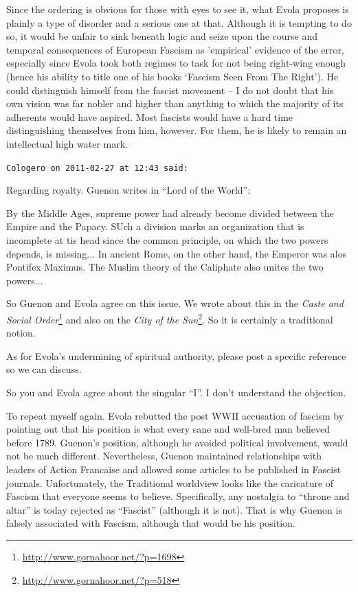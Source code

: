 \begin{footnotesize}
\begin{sffamily}
Since the ordering is obvious for those with eyes to see it, what Evola proposes is plainly a type of disorder and a serious one at that. Although it is tempting to do so, it would be unfair to sink beneath logic and seize upon the course and temporal consequences of European Fascism as 'empirical' evidence of the error, especially since Evola took both regimes to task for not being right-wing enough (hence his ability to title one of his books `Fascism Seen From The Right'). He could distinguish himself from the fascist movement -- I do not doubt that his own vision was far nobler and higher than anything to which the majority of its adherents would have aspired. Most fascists would have a hard time distinguishing themselves from him, however. For them, he is likely to remain an intellectual high water mark.

\hfill

\texttt{Cologero on 2011-02-27 at 12:43 said:}

Regarding royalty. Guenon writes in ``Lord of the World'':

\begin{quotex}

By the Middle Ages, supreme power had already become divided between the Empire and the Papacy. SUch a division marks an organization that is incomplete at tis head since the common principle, on which the two powers depends, is missing... In ancient Rome, on the other hand, the Emperor was alos Pontifex Maximus. The Muslim theory of the Caliphate also unites the two powers... \end{quotex}


So Guenon and Evola agree on this issue. We wrote about this in the \textit{Caste and Social Order}\footnote{\url{http://www.gornahoor.net/?p=1698}} and also on the \textit{City of the Sun}\footnote{\url{http://www.gornahoor.net/?p=518}}. So it is certainly a traditional notion.

As for Evola's undermining of spiritual authority, please post a specific reference so we can discuss.

So you and Evola agree about the singular ``I''. I don't understand the objection.

To repeat myself again. Evola rebutted the post WWII accusation of fascism by pointing out that his position is what every sane and well-bred man believed before 1789. Guenon's position, although he avoided political involvement, would not be much different. Nevertheless, Guenon maintained relationships with leaders of Action Francaise and allowed some articles to be published in Fascist journals. Unfortunately, the Traditional worldview looks like the caricature of Fascism that everyone seems to believe. Specifically, any nostalgia to ``throne and altar'' is today rejected as ``Fascist'' (although it is not). That is why Guenon is falsely associated with Fascism, although that would be his position.


\end{sffamily}
\end{footnotesize}
